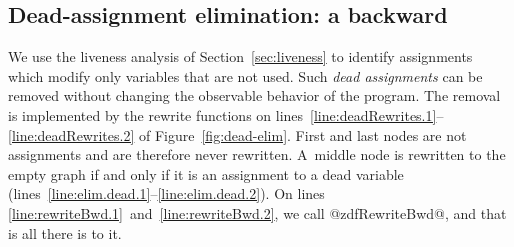 \documentclass[blockstyle,preprint,natbib,nocopyrightspace]{sigplanconf}
\newcommand\linepairref[2]{lines \ref{line:#1}~and~\ref{line:#2}}
\newcommand\linerangeref[2]{\mbox{lines~\ref{line:#1}--\ref{line:#2}}}
\newcommand{\authornote}[1]{{\em #1}}
\def\authornote#1{\unskip\relax}
\newcommand{\norman}[1]{\authornote{NR: #1}}
\let\remark\norman
\def\finalremark#1{\relax}
\newcommand\secref[1]{Section~\ref{sec:#1}}
\newcommand\seclabel[1]{\label{sec:#1}}
\newcommand\figref[1]{Figure~\ref{fig:#1}}
\begin{document}
\subsection{Dead-assignment elimination: a backward }


\seclabel{dead-code-elimination}
\seclabel{dead-code-elim}

\seclabel{bwd-rewrite}


\def\liveout{$\mathit{live_{out}}$}

We use the liveness analysis of \secref{liveness} to identify
assignments which modify only variables that are not used.
Such \emph{dead assignments} can be removed without changing the
observable behavior of the program.
The removal is implemented by the rewrite functions on
\linerangeref{deadRewrites.1}{deadRewrites.2} of \figref{dead-elim}. 
First and last nodes are not assignments and are therefore never
rewritten.
A~middle node is rewritten to the empty graph if and only if it is an
assignment to a dead variable (\linerangeref{elim.dead.1}{elim.dead.2}).
On \linepairref{rewriteBwd.1}{rewriteBwd.2}, we call @zdfRewriteBwd@, and
that is all there is to it.
\finalremark{JD: Need to run this version of the code in anger.}
%
\remark{In this space we should have some guff about
composing transformations, which should refer to the example on
eliminating the induction variable.
More generally, list some places dead-assignment elim is used and
include \secref{induction-var-elim}.
}
\end{document}
